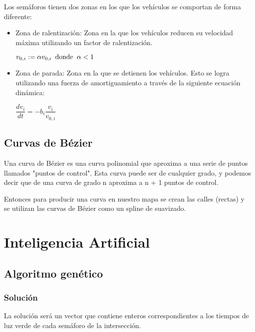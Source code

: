 \documentclass[twoside,twocolumn]{article} %
\begin{document}
	Los sem\'aforos tienen dos zonas en los que los veh\'iculos se comportan de forma diferente:
	\begin{itemize}
		\item Zona de ralentización: Zona en la que los vehículos reducen su velocidad máxima utilizando un factor de ralentización.
		\begin{center}
			$ v_{0,i} := \alpha v_{0,i} \text{\hspace{0.2em} donde \hspace{0.2em}} \alpha < 1$
		\end{center}
		\item Zona de parada: Zona en la que se detienen los vehículos. Esto se logra utilizando una fuerza de amortiguamiento a través de la siguiente ecuación dinámica:
		\begin{center}
			$ \dfrac{dv_{i}}{dt} = -b_{i} \dfrac{v_{i}}{v_{0,i}} $
		\end{center}
	\end{itemize}
	
	\subsection{Curvas de Bézier}
	
	Una curva de Bézier es una curva polinomial que aproxima a una serie de puntos llamados "puntos de control". Esta curva puede ser de cualquier grado, y podemos decir que de una curva de grado n aproxima a  n + 1 puntos de control. 
	
	Entonces para producir una curva en nuestro mapa se crean las calles (rectas) y se utilizan las curvas de B\'ezier como un spline de suavizado.
	 
	\section{Inteligencia Artificial}
	
		\subsection{Algoritmo genético}
		
		\subsubsection{Solución}
		
		La solución será un vector que contiene enteros correspondientes a los tiempos de luz verde de cada semáforo de la intersección.
		
\end{document}
